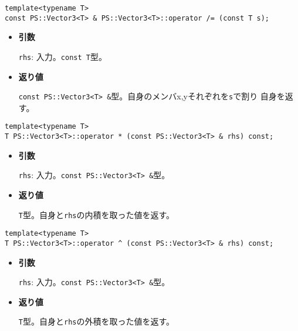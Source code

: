 \begin{screen}
\begin{verbatim}
template<typename T>
const PS::Vector3<T> & PS::Vector3<T>::operator /= (const T s);
\end{verbatim}
\end{screen}

\begin{itemize}

\item{{\bf 引数}}

{\tt rhs}: 入力。{\tt const T}型。

\item{{\bf 返り値}}

{\tt const PS::Vector3<T> \&}型。自身のメンバx,yそれぞれを{\tt s}で割り
自身を返す。

\end{itemize}


\mbox{}

\begin{screen}
\begin{verbatim}
template<typename T>
T PS::Vector3<T>::operator * (const PS::Vector3<T> & rhs) const;
\end{verbatim}
\end{screen}

\begin{itemize}

\item{{\bf 引数}}

{\tt rhs}: 入力。{\tt const PS::Vector3<T> \&}型。

\item{{\bf 返り値}}

{\tt T}型。自身と{\tt rhs}の内積を取った値を返す。

\end{itemize}

\begin{screen}
\begin{verbatim}
template<typename T>
T PS::Vector3<T>::operator ^ (const PS::Vector3<T> & rhs) const;
\end{verbatim}
\end{screen}

\begin{itemize}

\item{{\bf 引数}}

{\tt rhs}: 入力。{\tt const PS::Vector3<T> \&}型。

\item{{\bf 返り値}}

{\tt T}型。自身と{\tt rhs}の外積を取った値を返す。

\end{itemize}


